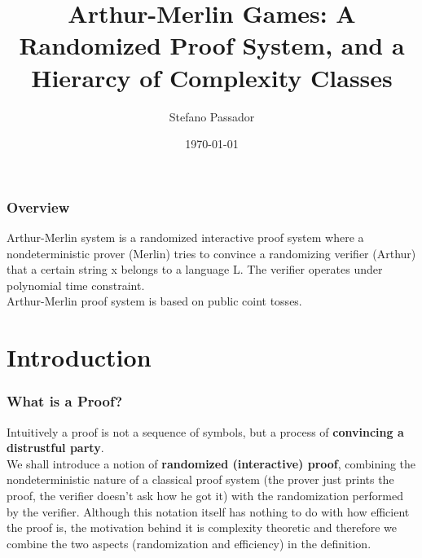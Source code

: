 \documentclass{beamer}
\title[Arthur-Merlin Games]{Arthur-Merlin Games: A Randomized Proof System, and a Hierarcy of Complexity Classes} %
\author{Stefano Passador} %
\institute[UNIUD] %
{
University of Udine \\ %
\medskip
\textit{passador.stefano@spes.uniud.it} %
}
\date{\today} %
\begin{document}
\begin{frame}
\titlepage %
\end{frame}

\begin{frame}
\frametitle{Overview} %
\tableofcontents %
\end{frame}


\begin{frame}
Arthur-Merlin system is a randomized interactive proof system where a nondeterministic prover (Merlin) tries to convince a randomizing verifier (Arthur) that a certain string x belongs to a language L. The verifier operates under polynomial time constraint. \\
Arthur-Merlin proof system is based on public coint tosses.
\end{frame}



\section{Introduction}

\begin{frame}
\frametitle{What is a Proof?}
Intuitively a proof is not a sequence of symbols, but a process of \textbf{convincing a distrustful party}.\\
We shall introduce a notion of \textbf{randomized (interactive) proof}, combining the nondeterministic nature of a classical proof system (the prover just prints the proof, the verifier doesn't ask how he got it) with the randomization performed by the verifier. Although this notation itself has nothing to do with how efficient the proof is, the motivation behind it is complexity theoretic and therefore we combine the two aspects (randomization and efficiency) in the definition.
\end{frame}
\end{document}

